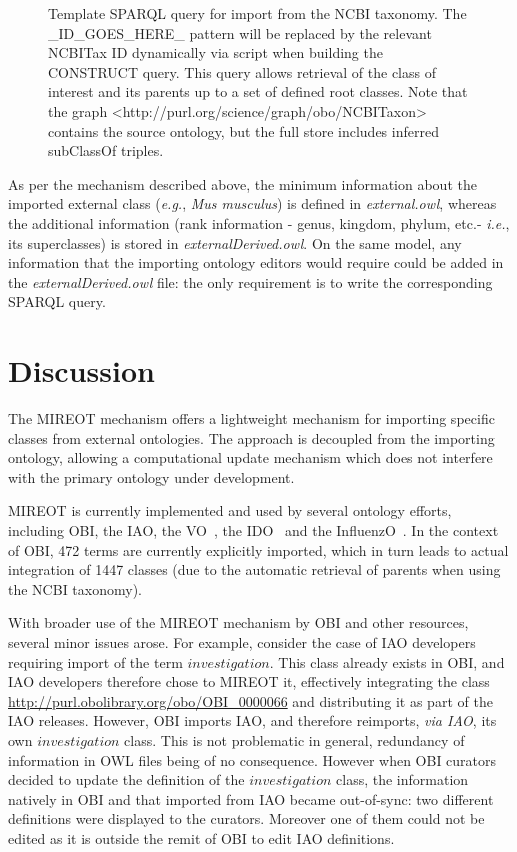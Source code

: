 \documentclass[jou]{ao2e}%
\begin{document}
\begin{figure}[t]
\scriptsize
 
\caption{Template SPARQL query for import from the NCBI taxonomy. The \_ID\_GOES\_HERE\_ pattern will be replaced by the relevant NCBITax ID dynamically via script when building the CONSTRUCT query. This query allows retrieval of the class of interest and its parents up to a set of defined root classes. Note that the graph <http://purl.org/science/graph/obo/NCBITaxon> contains the source ontology, but the full store includes inferred subClassOf triples.}
\label{fig:sparql2}
\end{figure}
As per the mechanism described above, the minimum information about the imported external class (\emph{e.g.}, \emph{Mus musculus}) is defined in \emph{external.owl}, whereas the additional information (rank information - genus, kingdom, phylum, etc.- \emph{i.e.}, its  superclasses) is stored in \emph{ externalDerived.owl}.
On the same model, any information that the importing ontology editors would require could be added in the \emph{externalDerived.owl} file: the only requirement is to write the corresponding SPARQL query.


\section*{Discussion}

The MIREOT mechanism offers a lightweight mechanism for importing specific classes from external ontologies. The approach is decoupled from the importing ontology, allowing a computational update mechanism which does not interfere with the primary ontology under development.

\ac{MIREOT} is currently implemented and used by several ontology efforts, including \ac{OBI}, the \ac{IAO}, the \ac{VO}~\citep{VO}, the \ac{IDO}~\citep{IDO} and the \ac{InfluenzO}~\citep{InfluenzO}.
In the context of \ac{OBI}, 472 terms are currently explicitly imported, which in turn leads to actual integration of 1447 classes (due to the automatic retrieval of parents when using the NCBI taxonomy). 



With broader use of the MIREOT mechanism by OBI and other resources, several minor issues arose.
For example, consider the case of \ac{IAO} developers requiring import of the term $investigation$.  This class already exists in \ac{OBI}, and \ac{IAO} developers therefore chose to MIREOT it, effectively integrating the class \url{http://purl.obolibrary.org/obo/OBI_0000066} and distributing it as part of the \ac{IAO} releases.
However, \ac{OBI} imports \ac{IAO}, and therefore reimports, \emph{via IAO}, its own $investigation$ class. This is not problematic in general, redundancy of information in OWL files being of no consequence. However when \ac{OBI} curators decided to update the definition of the $investigation$ class, the information natively in \ac{OBI} and that imported from \ac{IAO} became out-of-sync: two different definitions were displayed to the curators. Moreover one of them could not be edited as it is outside the remit of OBI to edit IAO definitions.
\end{document}
